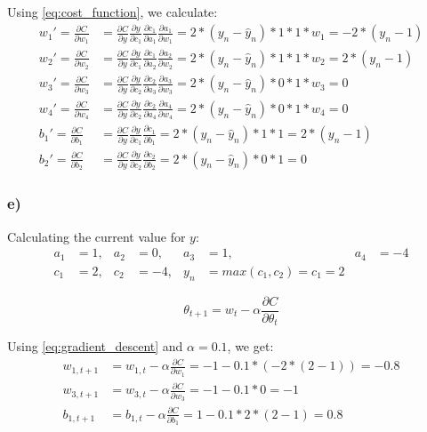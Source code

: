 Using \cref{eq:cost_function}, we calculate: 
\begin{align*}
        w_1' = \frac{ \partial C}{\partial w_1} 
    &= \frac{\partial C}{\partial y} \frac{\partial y}{\partial c_1} 
    \frac{\partial c_1}{\partial a_1} \frac{\partial a_1}{\partial w_1}
    = 2 * (y_n - \hat{y}_n) * 1 * 1 * w_1 = - 2 * (y_n - 1) \\
        w_2' = \frac{\partial C}{\partial w_2} 
    &= \frac{\partial C}{\partial y} \frac{\partial y}{\partial c_1} 
    \frac{\partial c_1}{\partial a_2} \frac{\partial a_2}{\partial w_2}
    = 2 * (y_n - \hat{y}_n) * 1 * 1 * w_2 = 2 * (y_n - 1) \\
        w_3' = \frac{\partial C}{\partial w_3} 
    &= \frac{\partial C}{\partial y} \frac{\partial y}{\partial c_2} 
    \frac{\partial c_2}{\partial a_3} \frac{\partial a_3}{\partial w_3}
    = 2 * (y_n - \hat{y}_n) * 0 * 1 * w_3 = 0 \\
        w_4' = \frac{\partial C}{\partial w_4} 
    &= \frac{\partial C}{\partial y} \frac{\partial y}{\partial c_2} 
    \frac{\partial c_2}{\partial a_4} \frac{\partial a_4}{\partial w_4}
    = 2 * (y_n - \hat{y}_n) * 0 * 1 * w_4 = 0 \\
        b_1' = \frac{\partial C}{\partial b_1} 
    &= \frac{\partial C}{\partial y} \frac{\partial y}{\partial c_1} 
    \frac{\partial c_1}{\partial b_1} 
    = 2 * (y_n - \hat{y}_n) * 1 * 1 = 2 * (y_n - 1) \\ 
        b_2' = \frac{\partial C}{\partial b_2}
    &= \frac{\partial C}{\partial y} \frac{\partial y}{\partial c_2} 
    \frac{\partial c_2}{\partial b_2} 
    = 2 * (y_n - \hat{y}_n) * 0 * 1 = 0
\end{align*}

\subsubsection*{e)}
Calculating the current value for $y$: 
\begin{align*}
    a_1 &= 1,& a_2 &= 0,& a_3 &= 1,& a_4 &= -4 \\
    c_1 &= 2,& c_2 &= -4,& y_n  &= max(c_1, c_2) = c_1 = 2
\end{align*}

\begin{equation}
    \label{eq:gradient_descent}
    \theta_{t+1} = w_t - \alpha \frac{\partial C}{\partial \theta_t}
\end{equation}

Using \cref{eq:gradient_descent} and $\alpha = 0.1$, we get: 
\begin{align*}
    w_{1, t + 1} 
    &= w_{1, t} - \alpha \frac{ \partial C}{\partial w_1} 
     = -1 - 0.1 * ( - 2 * (2 - 1)) = - 0.8 \\
    w_{3, t + 1} 
    &= w_{3, t} - \alpha \frac{ \partial C}{\partial w_3} 
     = -1 - 0.1 * 0 = - 1 \\
    b_{1, t + 1} 
    &= b_{1, t} - \alpha \frac{ \partial C}{\partial b_1} 
     = 1 - 0.1 * 2 * (2 - 1) = 0.8
\end{align*}

